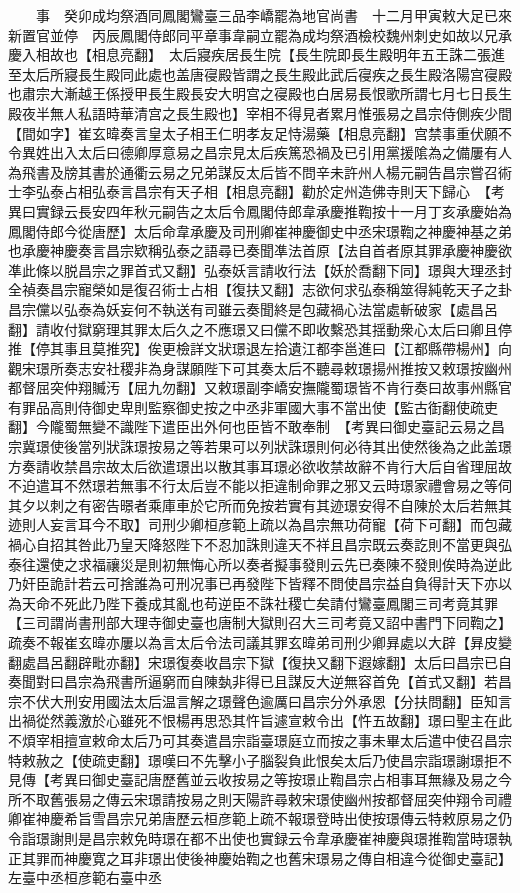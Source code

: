 　　事　癸卯成均祭酒同鳳閣鸞臺三品李嶠罷為地官尚書　十二月甲寅敕大足已來新置官並停　丙辰鳳閣侍郎同平章事韋嗣立罷為成均祭酒檢校魏州刺史如故以兄承慶入相故也【相息亮翻】　太后寢疾居長生院【長生院即長生殿明年五王誅二張進至太后所寢長生殿同此處也盖唐寑殿皆謂之長生殿此武后寑疾之長生殿洛陽宫寑殿也肅宗大漸越王係授甲長生殿長安大明宫之寑殿也白居易長恨歌所謂七月七日長生殿夜半無人私語時華清宫之長生殿也】宰相不得見者累月惟張易之昌宗侍側疾少間【間如字】崔玄暐奏言皇太子相王仁明孝友足恃湯藥【相息亮翻】宫禁事重伏願不令異姓出入太后曰德卿厚意易之昌宗見太后疾篤恐禍及已引用黨援隂為之備屢有人為飛書及牓其書於通衢云易之兄弟謀反太后皆不問辛未許州人楊元嗣告昌宗嘗召術士李弘泰占相弘泰言昌宗有天子相【相息亮翻】勸於定州造佛寺則天下歸心　【考異曰實録云長安四年秋元嗣告之太后令鳳閣侍郎韋承慶推鞫按十一月丁亥承慶始為鳳閣侍郎今從唐歷】太后命韋承慶及司刑卿崔神慶御史中丞宋璟鞫之神慶神基之弟也承慶神慶奏言昌宗欵稱弘泰之語尋已奏聞凖法首原【法自首者原其罪承慶神慶欲凖此條以脱昌宗之罪首式又翻】弘泰妖言請收行法【妖於喬翻下同】璟與大理丞封全禎奏昌宗寵榮如是復召術士占相【復扶又翻】志欲何求弘泰稱筮得純乾天子之卦昌宗儻以弘泰為妖妄何不執送有司雖云奏聞終是包藏禍心法當處斬破家【處昌呂翻】請收付獄窮理其罪太后久之不應璟又曰儻不即收繫恐其揺動衆心太后曰卿且停推【停其事且莫推究】俟更檢詳文狀璟退左拾遺江都李邕進曰【江都縣帶楊州】向觀宋璟所奏志安社稷非為身謀願陛下可其奏太后不聽尋敕璟揚州推按又敕璟按幽州都督屈突仲翔贓汚【屈九勿翻】又敕璟副李嶠安撫隴蜀璟皆不肯行奏曰故事州縣官有罪品高則侍御史卑則監察御史按之中丞非軍國大事不當出使【監古衘翻使疏吏翻】今隴蜀無變不識陛下遣臣出外何也臣皆不敢奉制　【考異曰御史臺記云易之昌宗冀璟使後當列狀誅璟按易之等若果可以列狀誅璟則何必待其出使然後為之此盖璟方奏請收禁昌宗故太后欲遣璟出以散其事耳璟必欲收禁故辭不肯行大后自省理屈故不迫遣耳不然璟若無事不行太后豈不能以拒違制命罪之邪又云時璟家禮會易之等伺其夕以刺之有密告暻者乘庫車於它所而免按若實有其迹璟安得不自陳於太后若無其迹則人妄言耳今不取】司刑少卿桓彦範上疏以為昌宗無功荷寵【荷下可翻】而包藏禍心自招其咎此乃皇天降怒陛下不忍加誅則違天不祥且昌宗既云奏訖則不當更與弘泰往還使之求福禳災是則初無悔心所以奏者擬事發則云先已奏陳不發則俟時為逆此乃奸臣詭計若云可捨誰為可刑况事已再發陛下皆釋不問使昌宗益自負得計天下亦以為天命不死此乃陛下養成其亂也苟逆臣不誅社稷亡矣請付鸞臺鳳閣三司考竟其罪【三司謂尚書刑部大理寺御史臺也唐制大獄則召大三司考竟又詔中書門下同鞫之】疏奏不報崔玄暐亦屢以為言太后令法司議其罪玄暐弟司刑少卿昪處以大辟【昪皮變翻處昌呂翻辟毗亦翻】宋璟復奏收昌宗下獄【復抉又翻下遐嫁翻】太后曰昌宗已自奏聞對曰昌宗為飛書所逼窮而自陳埶非得已且謀反大逆無容首免【首式又翻】若昌宗不伏大刑安用國法太后温言解之璟聲色逾厲曰昌宗分外承恩【分扶問翻】臣知言出禍從然義激於心雖死不恨楊再思恐其忤旨遽宣敕令出【忤五故翻】璟曰聖主在此不煩宰相擅宣敕命太后乃可其奏遣昌宗詣臺璟庭立而按之事未畢太后遣中使召昌宗特敕赦之【使疏吏翻】璟嘆曰不先擊小子腦裂負此恨矣太后乃使昌宗詣璟謝璟拒不見傳【考異曰御史臺記唐歷舊並云收按易之等按璟止鞫昌宗占相事耳無緣及易之今所不取舊張易之傳云宋璟請按易之則天陽許尋敕宋璟使幽州按都督屈突仲翔令司禮卿崔神慶希旨雪昌宗兄弟唐歷云桓彦範上疏不報璟登時出使按璟傳云特敕原易之仍令詣璟謝則是昌宗敕免時璟在都不出使也實録云令韋承慶崔神慶與璟推鞫當時璟執正其罪而神慶寛之耳非璟出使後神慶始鞫之也舊宋璟易之傳自相違今從御史臺記】左臺中丞桓彦範右臺中丞